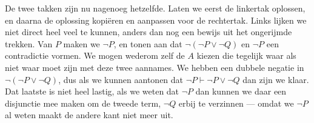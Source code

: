 \begin{example}
\begin{prooftree}


\end{prooftree}

De twee takken zijn nu nagenoeg hetzelfde. Laten we eerst de linkertak oplossen, en daarna de oplossing kopi\"eren en aanpassen voor de rechtertak.  Links lijken we niet direct heel veel te kunnen, anders dan nog een bewijs uit het ongerijmde trekken. Van $P$ maken we $\neg P$, en tonen aan dat $\neg (\neg P \lor \neg Q)$ en $\neg P$ een contradictie vormen. We mogen wederom zelf de $A$ kiezen die tegelijk waar als niet waar moet zijn met deze twee aannames.  We hebben een dubbele negatie in $\neg (\neg P \lor \neg Q)$, dus als we kunnen aantonen dat $\neg P \vdash \neg P \lor \neg Q$ dan zijn we klaar. Dat laatste is niet heel lastig, als we weten dat $\neg P$ dan kunnen we daar een disjunctie mee maken om de tweede term, $\neg Q$ erbij te verzinnen --- omdat we $\neg P$ al weten maakt de andere kant niet meer uit.

\begin{wprooftree}






\end{wprooftree}


\end{example}
